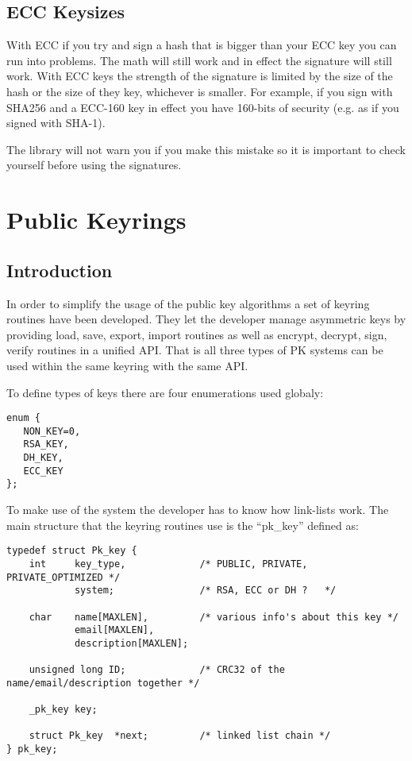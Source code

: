 \documentclass{book}
\begin{document}
\section{ECC Keysizes}
With ECC if you try and sign a hash that is bigger than your ECC key you can run into problems.  The math will still work
and in effect the signature will still work.  With ECC keys the strength of the signature is limited by the size of
the hash or the size of they key, whichever is smaller.  For example, if you sign with SHA256 and a ECC-160 key in effect
you have 160-bits of security (e.g. as if you signed with SHA-1).  

The library will not warn you if you make this mistake so it is important to check yourself before using the 
signatures.

\chapter{Public Keyrings}
\section{Introduction}
In order to simplify the usage of the public key algorithms a set of keyring routines have been developed.  They let the 
developer manage asymmetric keys by providing load, save, export, import routines as well as encrypt, decrypt, sign, verify
routines in a unified API.  That is all three types of PK systems can be used within the same keyring with the same API.

To define types of keys there are four enumerations used globaly:
\begin{verbatim}
enum {
   NON_KEY=0,
   RSA_KEY,
   DH_KEY,
   ECC_KEY
};
\end{verbatim}

To make use of the system the developer has to know how link-lists work.  The main structure that the keyring routines use 
is the ``pk\_key'' defined as:
\begin{small}
\begin{verbatim}
typedef struct Pk_key {
    int     key_type,             /* PUBLIC, PRIVATE, PRIVATE_OPTIMIZED */
            system;               /* RSA, ECC or DH ?   */

    char    name[MAXLEN],         /* various info's about this key */
            email[MAXLEN],
            description[MAXLEN];

    unsigned long ID;             /* CRC32 of the name/email/description together */

    _pk_key key;

    struct Pk_key  *next;         /* linked list chain */
} pk_key;
\end{verbatim}
\end{small}
\end{document}
